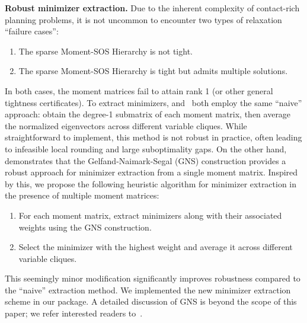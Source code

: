 \textbf{Robust minimizer extraction.} Due to the inherent complexity of contact-rich planning problems, it is not uncommon to encounter two types of relaxation ``failure cases'':  
\begin{enumerate}
    \item The sparse Moment-SOS Hierarchy is not tight.  
    \item The sparse Moment-SOS Hierarchy is tight but admits multiple solutions.  
\end{enumerate}  
In both cases, the moment matrices fail to attain rank 1 (or other general tightness certificates).  
To extract minimizers, \tssos and~\cite{kang2024wafr-strom} both employ the same ``naive'' approach: obtain the degree-1 submatrix of each moment matrix, then average the normalized eigenvectors across different variable cliques. While straightforward to implement, this method is not robust in practice, often leading to infeasible local rounding and large suboptimality gaps.  
On the other hand,~\cite{klep2018siopt-minimizer-extraction-robust} demonstrates that the Gelfand-Naimark-Segal (GNS) construction provides a robust approach for minimizer extraction from a single moment matrix. Inspired by this, we propose the following heuristic algorithm for minimizer extraction in the presence of multiple moment matrices:  
\begin{enumerate}
    \item For each moment matrix, extract minimizers along with their associated weights using the GNS construction.  
    \item Select the minimizer with the highest weight and average it across different variable cliques.  
\end{enumerate}  
This seemingly minor modification significantly improves robustness compared to the ``naive'' extraction method. We implemented the new minimizer extraction scheme in our \spot package. A detailed discussion of GNS is beyond the scope of this paper; we refer interested readers to~\cite{klep2018siopt-minimizer-extraction-robust}. 





